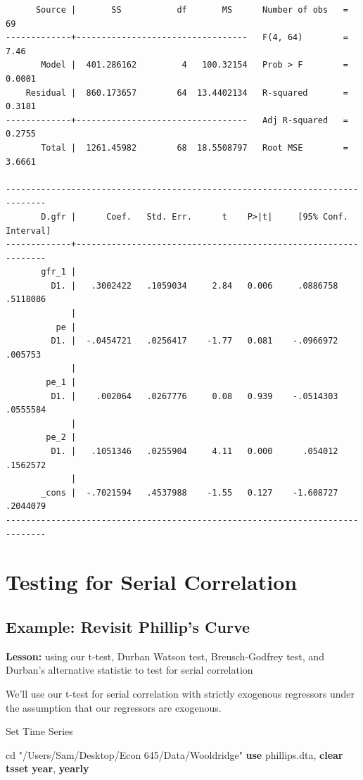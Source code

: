 \documentclass[
]{book}
\newenvironment{Shaded}{\begin{snugshade}}{\end{snugshade}}
\newcommand{\FunctionTok}[1]{\textcolor[rgb]{0.13,0.29,0.53}{\textbf{#1}}}
\newcommand{\KeywordTok}[1]{\textcolor[rgb]{0.13,0.29,0.53}{\textbf{#1}}}
\newcommand{\NormalTok}[1]{#1}
\newcommand{\StringTok}[1]{\textcolor[rgb]{0.31,0.60,0.02}{#1}}
\begin{document}
\begin{verbatim}
      Source |       SS           df       MS      Number of obs   =        69
-------------+----------------------------------   F(4, 64)        =      7.46
       Model |  401.286162         4   100.32154   Prob > F        =    0.0001
    Residual |  860.173657        64  13.4402134   R-squared       =    0.3181
-------------+----------------------------------   Adj R-squared   =    0.2755
       Total |  1261.45982        68  18.5508797   Root MSE        =    3.6661

------------------------------------------------------------------------------
       D.gfr |      Coef.   Std. Err.      t    P>|t|     [95% Conf. Interval]
-------------+----------------------------------------------------------------
       gfr_1 |
         D1. |   .3002422   .1059034     2.84   0.006     .0886758    .5118086
             |
          pe |
         D1. |  -.0454721   .0256417    -1.77   0.081    -.0966972     .005753
             |
        pe_1 |
         D1. |    .002064   .0267776     0.08   0.939    -.0514303    .0555584
             |
        pe_2 |
         D1. |   .1051346   .0255904     4.11   0.000      .054012    .1562572
             |
       _cons |  -.7021594   .4537988    -1.55   0.127    -1.608727    .2044079
------------------------------------------------------------------------------
\end{verbatim}

\chapter{Testing for Serial Correlation}\label{testing-for-serial-correlation}

\section{Example: Revisit Phillip's Curve}\label{example-revisit-phillips-curve}

\textbf{Lesson:} using our t-test, Durban Watson test, Breusch-Godfrey test, and Durban's alternative statistic to test for serial correlation

We'll use our t-test for serial correlation with strictly exogenous regressors
under the assumption that our regressors are exogenous.

Set Time Series

\begin{Shaded}
\begin{Highlighting}[]
\NormalTok{cd }\StringTok{"/Users/Sam/Desktop/Econ 645/Data/Wooldridge"}
\KeywordTok{use}\NormalTok{ phillips.dta, }\KeywordTok{clear}
\KeywordTok{tsset} \FunctionTok{year}\NormalTok{, }\FunctionTok{yearly}
\end{Highlighting}
\end{Shaded}
\end{document}
